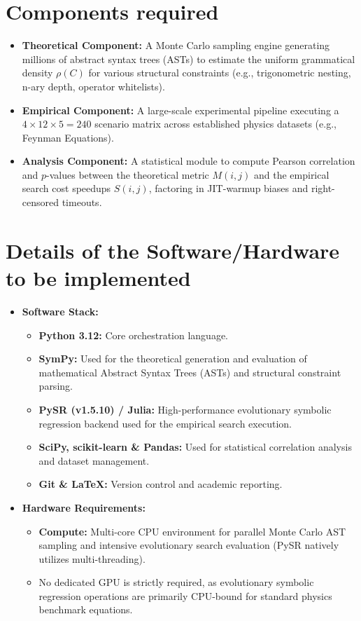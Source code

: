 \documentclass[11pt,a4paper]{article}
\begin{document}
\section*{Components required}
\begin{itemize}[leftmargin=*]
    \item \textbf{Theoretical Component:} A Monte Carlo sampling engine generating millions of abstract syntax trees (ASTs) to estimate the uniform grammatical density $\rho(C)$ for various structural constraints (e.g., trigonometric nesting, n-ary depth, operator whitelists).
    \item \textbf{Empirical Component:} A large-scale experimental pipeline executing a $4 \times 12 \times 5 = 240$ scenario matrix across established physics datasets (e.g., Feynman Equations).
    \item \textbf{Analysis Component:} A statistical module to compute Pearson correlation and $p$-values between the theoretical metric $M(i,j)$ and the empirical search cost speedups $S(i,j)$, factoring in JIT-warmup biases and right-censored timeouts.
\end{itemize}

\section*{Details of the Software/Hardware to be implemented}
\begin{itemize}[leftmargin=*]
    \item \textbf{Software Stack:} 
    \begin{itemize}
        \item \textbf{Python 3.12:} Core orchestration language.
        \item \textbf{SymPy:} Used for the theoretical generation and evaluation of mathematical Abstract Syntax Trees (ASTs) and structural constraint parsing.
        \item \textbf{PySR (v1.5.10) / Julia:} High-performance evolutionary symbolic regression backend used for the empirical search execution.
        \item \textbf{SciPy, scikit-learn \& Pandas:} Used for statistical correlation analysis and dataset management.
        \item \textbf{Git \& LaTeX:} Version control and academic reporting.
    \end{itemize}
    \item \textbf{Hardware Requirements:}
    \begin{itemize}
        \item \textbf{Compute:} Multi-core CPU environment for parallel Monte Carlo AST sampling and intensive evolutionary search evaluation (PySR natively utilizes multi-threading). 
        \item No dedicated GPU is strictly required, as evolutionary symbolic regression operations are primarily CPU-bound for standard physics benchmark equations.
    \end{itemize}
\end{itemize}
\end{document}
